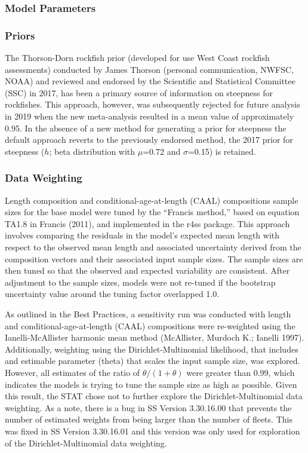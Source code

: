 \documentclass[
  english,
  a4paper,
]{article}
\begin{document}
\hypertarget{model-parameters}{%
\subsubsection{Model Parameters}\label{model-parameters}}

\hypertarget{priors}{%
\subsubsection{Priors}\label{priors}}

The Thorson-Dorn rockfish prior (developed for use West Coast rockfish assessments) conducted by James Thorson (personal communication, NWFSC, NOAA) and reviewed and endorsed by the Scientific and Statistical Committee (SSC) in 2017, has been a primary source of information on steepness for rockfishes. This approach, however, was subsequently rejected for future analysis in 2019 when the new meta-analysis resulted in a mean value of approximately 0.95. In the absence of a new method for generating a prior for steepness the default approach reverts to the previously endorsed method, the 2017 prior for steepness (\(h\); beta distribution with \(\mu\)=0.72 and \(\sigma\)=0.15) is retained.

\hypertarget{data-weighting}{%
\subsubsection{Data Weighting}\label{data-weighting}}

Length composition and conditional-age-at-length (CAAL) compositions sample sizes for
the base model were tuned by the ``Francis method,'' based on equation TA1.8 in Francis
(2011), and implemented in the r4ss package. This approach involves comparing
the residuals in the model's expected mean length with respect to the observed mean
length and associated uncertainty derived from the composition vectors and their
associated input sample sizes. The sample sizes are then tuned so that the observed
and expected variability are consistent. After adjustment to the sample sizes, models
were not re-tuned if the bootstrap uncertainty value around the tuning factor overlapped 1.0.

As outlined in the Best Practices, a sensitivity run was conducted with length and
conditional-age-at-length (CAAL) compositions were re-weighted using the
Ianelli-McAllister harmonic mean method (McAllister, Murdoch K.; Ianelli 1997). Additionally, weighting
using the Dirichlet-Multinomial likelihood, that includes and estimable parameter (theta)
that scales the input sample size, was explored. However, all estimates of the ratio of
\(\theta/(1+\theta)\) were greater than 0.99, which indicates the models is trying to tune
the sample size as high as possible. Given this result, the STAT chose not to further explore
the Dirichlet-Multinomial data weighting. As a note, there is a bug in SS Version 3.30.16.00 that
prevents the number of estimated weights from being larger than the number of fleets. This was
fixed in SS Version 3.30.16.01 and this version was only used for exploration of the Dirichlet-Multinomial data weighting.
\end{document}
